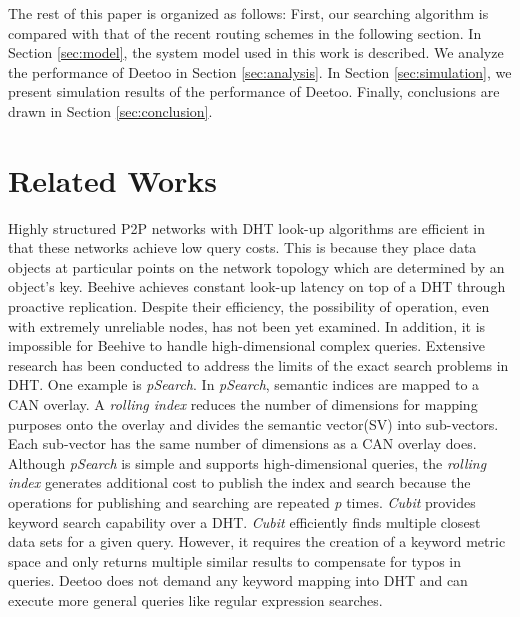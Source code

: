 \documentclass[conference]{IEEEtran}
\begin{document}
The rest of this paper is organized as follows: First, our searching
algorithm is compared with that of the recent routing schemes in the following section. 
In Section \ref{sec:model}, the system model
used in this work is described. We analyze the performance of Deetoo in
Section \ref{sec:analysis}. In Section \ref{sec:simulation}, we present
simulation results of the performance of Deetoo. Finally, conclusions are 
drawn in Section \ref{sec:conclusion}.

\section{Related Works}
\label{sec:related_works}
Highly structured P2P networks with DHT look-up algorithms 
\cite{is:Chord, sr:CAN, bz:Tapestry, pr:Symphony} 
are efficient in that these networks achieve low query costs. This is 
because they place data objects at particular points on the network topology
which are determined by an object's key. Beehive\cite{re:beehive04} 
achieves constant look-up latency on top of a
DHT through proactive replication. Despite their efficiency, the possibility 
of operation, even with extremely unreliable nodes, has not been yet
examined. In addition, it is impossible for Beehive to handle
high-dimensional complex queries.  Extensive research has been conducted 
to address the limits of the exact search problems in DHT.
One example is \emph{pSearch}.\cite{psearch}
In \emph{pSearch}, semantic indices are mapped to a CAN overlay. 
A \emph{rolling index} reduces the number of dimensions for mapping purposes 
onto the overlay and divides the semantic vector(SV) into sub-vectors. 
Each sub-vector has the same number of dimensions as a CAN overlay does.
Although \emph{pSearch} is simple and supports high-dimensional queries, 
the \emph{rolling index} generates additional cost to publish the index and search 
because the operations for publishing and searching are repeated \textit{p} times.
\emph{Cubit}\cite{cubit} provides keyword search capability over a DHT. \emph{Cubit} 
efficiently finds multiple closest data sets for a given query. However, 
it requires the creation of a keyword metric space and only returns multiple similar results
to compensate for typos in queries. Deetoo does not demand any keyword mapping 
into DHT and can execute more general queries like regular expression searches.
\end{document}
